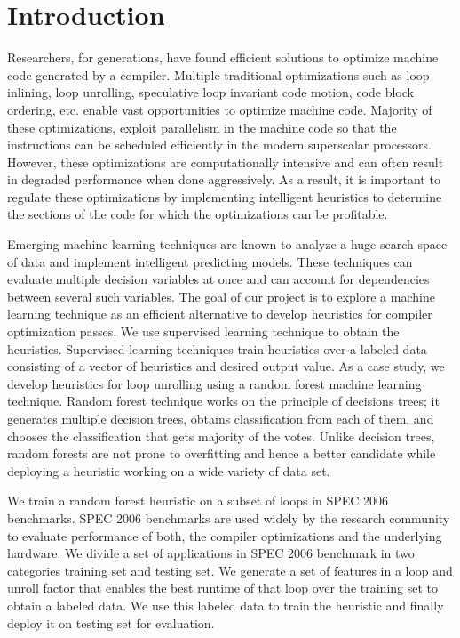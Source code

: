 \documentclass[]{sig-alternate}
\begin{document}
\section{Introduction}\label{sec:intro}
Researchers, for generations, have found efficient solutions to optimize machine code generated by a compiler. Multiple traditional optimizations such as loop inlining, loop unrolling, speculative loop invariant code motion, code block ordering, etc. enable vast opportunities to optimize machine code. Majority of these optimizations, exploit parallelism in the machine code so that the instructions can be scheduled efficiently in the modern superscalar processors. However, these optimizations are computationally intensive and can often result in degraded performance when done aggressively. As a result, it is important to regulate these optimizations by implementing intelligent heuristics to determine the sections of the code for which the optimizations can be profitable.

Emerging machine learning techniques are known to analyze a huge search space of data and implement intelligent predicting models. These techniques can evaluate multiple decision variables at once and can account for dependencies between several such variables. The goal of our project is to explore a machine learning technique as an efficient alternative to develop heuristics for compiler optimization passes. We use supervised learning technique to obtain the heuristics. Supervised learning techniques train heuristics over a labeled data consisting of a vector of heuristics and desired output value. As a case study, we develop heuristics for loop unrolling using a random forest machine learning technique.
Random forest technique works on the principle of decisions trees; it generates multiple decision trees, obtains classification from each of them, and chooses the classification that gets majority of the votes. Unlike decision trees, random forests are not prone to overfitting and hence a better candidate while deploying a heuristic working on a wide variety of data set.

We train a random forest heuristic on a subset of loops in SPEC 2006 benchmarks. SPEC 2006 benchmarks are used widely by the research community to evaluate performance of both, the compiler optimizations and the underlying hardware. We divide a set of applications in SPEC 2006 benchmark in two categories  training set and testing set. We generate a set of features in a loop and unroll factor that enables the best runtime of that loop over the training set to obtain a labeled data. We use this labeled data to train the heuristic and finally deploy it on testing set for evaluation.
\end{document}
